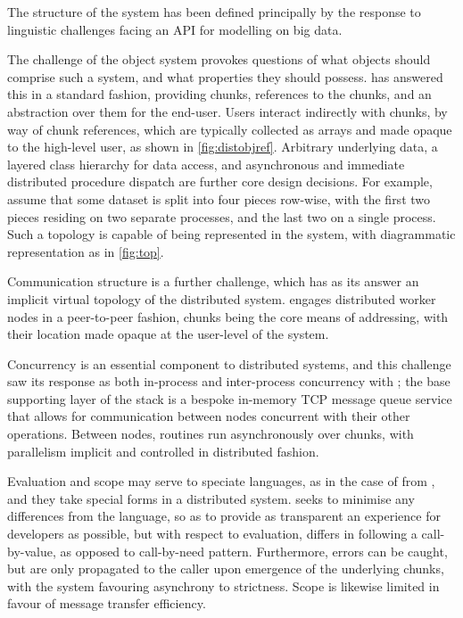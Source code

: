 The structure of the \lsr{} system has been defined principally by the response to linguistic challenges facing an API for modelling on big data.

The challenge of the object system provokes questions of what objects should comprise such a system, and what properties they should possess.
\lsr{} has answered this in a standard fashion, providing chunks, references to the chunks, and an abstraction over them for the end-user. Users interact indirectly with chunks, by way of chunk references, which are typically collected as arrays and made opaque to the high-level user, as shown in \cref{fig:distobjref}. Arbitrary underlying data, a layered class hierarchy for data access, and asynchronous and immediate distributed procedure dispatch are further core design decisions.
For example, assume that some dataset is split into four pieces row-wise, with the first two pieces residing on two separate processes, and the last two on a single process.
Such a topology is capable of being represented in the \lsr{} system, with diagrammatic representation as in \cref{fig:top}.



Communication structure is a further challenge, which has as its answer an implicit virtual topology of the distributed system.
\lsr{} engages distributed worker nodes in a peer-to-peer fashion, chunks being the core means of addressing, with their location made opaque at the user-level of the system.

Concurrency is an essential component to distributed systems, and this challenge saw its response as both in-process and inter-process concurrency with \lsr{}; the base supporting layer of the \lsr{} stack is a bespoke in-memory TCP message queue service that allows for communication between nodes concurrent with their other operations.
Between nodes, routines run asynchronously over chunks, with parallelism implicit and controlled in distributed fashion.

Evaluation and scope may serve to speciate languages, as in the case of \R{} from , and they take special forms in a distributed system.
\lsr{} seeks to minimise any differences from the \R{} language, so as to provide as transparent an experience for developers as possible, but with respect to evaluation, differs in following a call-by-value, as opposed to call-by-need pattern. Furthermore, errors can be caught, but are only propagated to the caller upon emergence of the underlying chunks, with the system favouring asynchrony to strictness. Scope is likewise limited in favour of message transfer efficiency.

